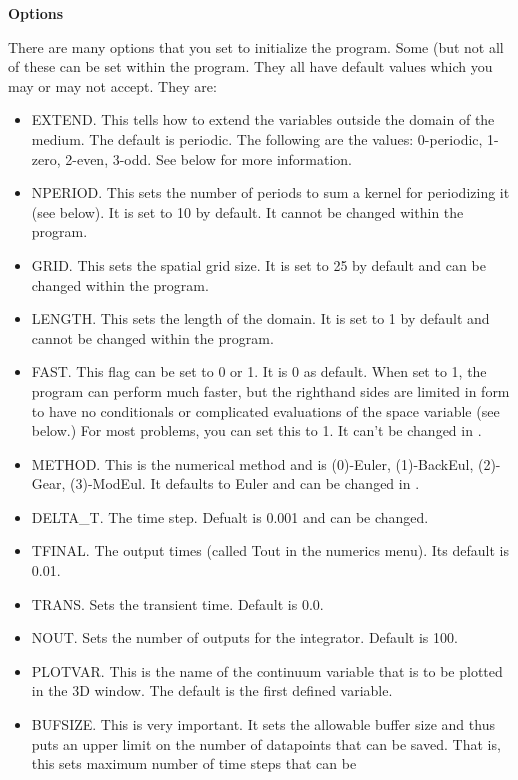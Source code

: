 \vspace{.25in}
\begin{center}
{\bf\large Options}
\end{center}
There are many options that you set to initialize the program.  Some
(but not all of these can be set within the program.  They all have
default values which you may or may not accept. They are:
\begin{itemize}
\item EXTEND. This tells \xtc how to extend the variables outside the
domain of the medium.  The default is periodic.  The following are the
values: 0-periodic, 1-zero, 2-even, 3-odd. See below for more
information.
\item NPERIOD. This sets the number of periods to sum a kernel for
periodizing it (see below).  It is set to 10 by default. It cannot be
changed within the program.
\item GRID.  This sets the spatial grid size.  It is set to 25 by
default and can be changed within the program.
\item LENGTH. This sets the length of the domain.  It is set to 1 by
default and cannot be changed within the program.
\item FAST.  This flag can be set to 0 or 1.  It is 0 as default.
When set to 1, the program can perform much faster, but the righthand
sides are limited in form to have no conditionals or complicated
evaluations of the space variable (see below.)  For most problems, you
can set this to 1.  It can't be changed in \xtc.
\item METHOD.  This is the numerical method and is (0)-Euler,
(1)-BackEul, (2)-Gear, (3)-ModEul.  It defaults to Euler and can be
changed in \xtc.
\item DELTA\_T.  The time step.  Defualt is 0.001 and can be changed.
\item TFINAL. The output times (called Tout in the numerics menu). Its
default is 0.01.
\item TRANS. Sets the transient time. Default is 0.0.
\item NOUT. Sets the number of outputs for the integrator. Default is 100.
\item PLOTVAR. This is the name of the continuum variable that is to
be plotted in the 3D window.  The default is the first defined variable.
\item BUFSIZE.  This is very important.  It sets the allowable buffer
size and thus puts an upper limit on the number of datapoints that can
be saved.  That is, this sets maximum number of time steps that can be

\end{itemize}
